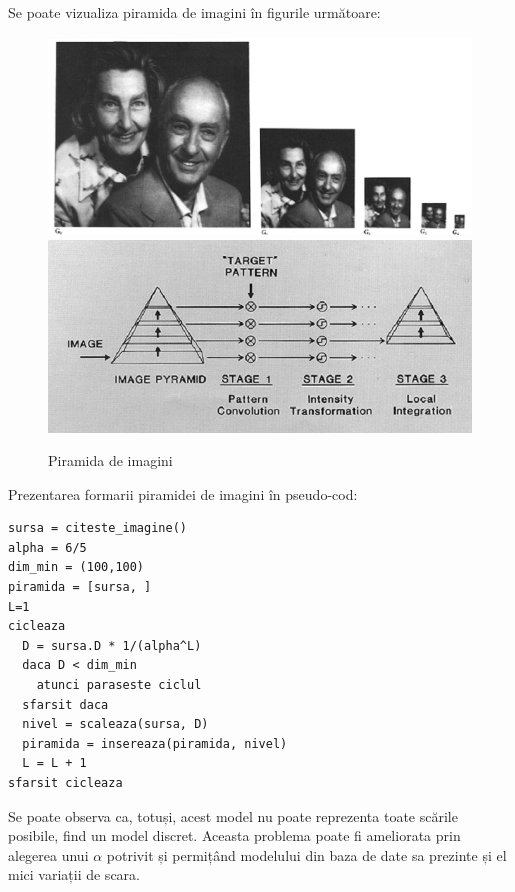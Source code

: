 Se poate vizualiza piramida de imagini în figurile următoare:

\begin{figure}[H]
	\centering
		\includegraphics[width=1.0\textwidth]{imagini/pyramid0.png}
		\includegraphics[width=1.0\textwidth]{imagini/pyramid1.png}
	\caption{Piramida de imagini\protect\footnotemark}
	\label{fig:Pyramids_Tutorial_Pyramid_Theory}
\end{figure}



Prezentarea formarii piramidei de imagini în pseudo-cod:
\begin{mdframed}
\begin{verbatim}
sursa = citeste_imagine()
alpha = 6/5
dim_min = (100,100)
piramida = [sursa, ]
L=1
cicleaza
  D = sursa.D * 1/(alpha^L)
  daca D < dim_min
    atunci paraseste ciclul
  sfarsit daca
  nivel = scaleaza(sursa, D)
  piramida = insereaza(piramida, nivel)
  L = L + 1
sfarsit cicleaza
\end{verbatim}
\end{mdframed}

Se poate observa ca, totuși, acest model nu poate reprezenta toate scările posibile, find un model discret.
Aceasta problema poate fi ameliorata prin alegerea unui ${\alpha}$ potrivit și permițând modelului din baza de date sa prezinte și el mici variații de scara.

